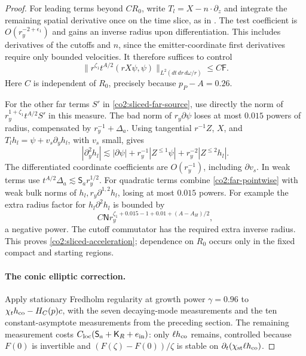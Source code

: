 \begin{proof}
For leading terms beyond $CR_0$, write $T_l=X-n\cdot\partial_z$ and
integrate the remaining spatial derivative once on the time slice, as in
.  The test coefficient is
$O(r_y^{-2+\epsilon_1})$ and gains an inverse radius upon differentiation.
This includes derivatives of the cutoffs and $n$, since the emitter-coordinate
first derivatives require only bounded velocities.  It therefore suffices to
control
\[
 \|r^{\zeta_1}t^{A/2}(rX\psi,\psi)\|_{L^2(dt\,dr\,d\omega/r)}
       \le C\mathsf F.
\]
Here $C$ is independent of $R_0$, precisely because $p_P-A=0.26$.

For the other far terms $S'$ in \eqref{co2:sliced-far-source}, use directly
the norm of $r_y^{1+\zeta_1}t^{A/2}S'$ in this measure.  The bad norm of
$r_y\partial\psi$ loses at most $0.015$ powers of radius, compensated by
$r_y^{-1}+\Delta_a$.  Using tangential $r^{-1}Z$, $X$, and
$T_lh_l=\psi+v_s\partial_yh_l$, with $v_s$ small, gives
\[
 |\partial_y^2h_l|
 \lesssim |\partial\psi|+r_y^{-1}|Z^{\le1}\psi|
                         +r_y^{-2}|Z^{\le2}h_l|.
\]
The differentiated coordinate coefficients are $O(r_y^{-1})$, including
$\partial v_s$.  In weak terms use
$t^{A/2}\Delta_a\lesssim\mathsf S_a r_y^{1/2}$.  For quadratic terms
combine \eqref{co2:far-pointwise} with weak bulk norms of
$h_l,r_y\partial^{1,2}h_l$, losing at most $0.015$ powers.  For example the
extra radius factor for $h_l\partial^2h_l$ is bounded by
\[
 C\mathsf N r_y^{\zeta_1+0.015-1+0.01+(A-A_H)/2},
\]
a negative power.  The cutoff commutator has the required extra inverse
radius.  This proves \eqref{co2:sliced-acceleration}; dependence on $R_0$
occurs only in the fixed compact and starting regions.

\paragraph{The conic elliptic correction.}
Apply stationary Fredholm regularity at growth power $\gamma=0.96$ to
$\chi_t h_{\rm co}-H_C(p)c$, with the seven decaying-mode measurements and
the ten constant-asymptote measurements from the preceding section.  The
remaining measurement costs
$C_{\rm loc}(\mathsf S_a+\mathsf K_R+e_{\rm in})$: only $\ell h_{\rm co}$
remains, controlled because $F(0)$ is invertible and
$(F(\zeta)-F(0))/\zeta$ is stable on
$\partial_t(\chi_{\rm st}\ell h_{\rm co})$.


\end{proof}
